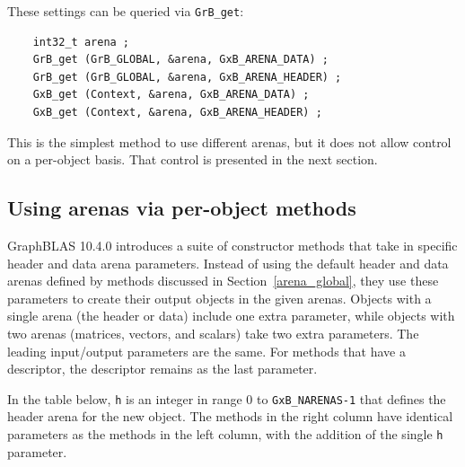These settings can be queried via \verb'GrB_get':

    {\footnotesize
    \begin{verbatim}
    int32_t arena ;
    GrB_get (GrB_GLOBAL, &arena, GxB_ARENA_DATA) ;
    GrB_get (GrB_GLOBAL, &arena, GxB_ARENA_HEADER) ;
    GxB_get (Context, &arena, GxB_ARENA_DATA) ;
    GxB_get (Context, &arena, GxB_ARENA_HEADER) ; \end{verbatim}}

This is the simplest method to use different arenas, but it does not allow
control on a per-object basis.  That control is presented in the next section.

\subsection{Using arenas via per-object methods}

GraphBLAS 10.4.0 introduces a suite of constructor methods that take in
specific header and data arena parameters.  Instead of using the default header
and data arenas defined by methods discussed in Section~\ref{arena_global},
they use these parameters to create their output objects in the given arenas.
Objects with a single arena (the header or data) include one extra parameter,
while objects with two arenas (matrices, vectors, and scalars) take two extra
parameters.  The leading input/output parameters are the same.  For methods
that have a descriptor, the descriptor remains as the last parameter.

In the table below, \verb'h' is an integer in range 0 to \verb'GxB_NARENAS-1'
that defines the header arena for the new object.  The methods in the right
column have identical parameters as the methods in the left column,
with the addition of the single \verb'h' parameter.

